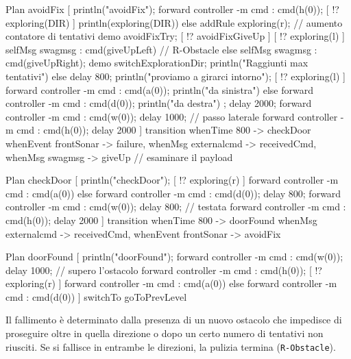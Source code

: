 \documentclass{../llncs}
\newcommand{\code}[1]{{\color{blue}\small{\texttt{#1}}}}
\begin{document}
\begin{qacode}[caption={SoftwareAgent, pt8}]
Plan avoidFix [
	println("avoidFix");
	forward controller -m cmd : cmd(h(0));
	[ !? exploring(DIR) ] println(exploring(DIR))
	else addRule exploring(r);
	// aumento contatore di tentativi
	demo avoidFixTry;
	[ !? avoidFixGiveUp ] {
		[ !? exploring(l) ] selfMsg swagmsg : cmd(giveUpLeft) // R-Obstacle
		else selfMsg swagmsg : cmd(giveUpRight);
		demo switchExplorationDir;
		println("Raggiunti max tentativi")
	} else {
		delay 800;
		println("proviamo a girarci intorno");
		[ !? exploring(l) ] {
			forward controller -m cmd : cmd(a(0));
			println("da sinistra")
		}
		else {
			forward controller -m cmd : cmd(d(0));
			println("da destra")
		};
		delay 2000;
		forward controller -m cmd : cmd(w(0));
		delay 1000; // passo laterale
		forward controller -m cmd : cmd(h(0));
		delay 2000
	}
]
transition
	whenTime 800 -> checkDoor
	whenEvent frontSonar -> failure,
	whenMsg externalcmd -> receivedCmd,
	whenMsg swagmsg -> giveUp // esaminare il payload

Plan checkDoor [
	println("checkDoor");
	[ !? exploring(r) ] forward controller -m cmd : cmd(a(0))
	else forward controller -m cmd : cmd(d(0));
	delay 800;
	forward controller -m cmd : cmd(w(0));
	delay 800; // testata
	forward controller -m cmd : cmd(h(0));
	delay 2000
]
transition
	whenTime 800 -> doorFound
	whenMsg externalcmd -> receivedCmd,
	whenEvent frontSonar -> avoidFix

Plan doorFound [
	println("doorFound");
	forward controller -m cmd : cmd(w(0));
	delay 1000; // supero l'ostacolo
	forward controller -m cmd : cmd(h(0));
	[ !? exploring(r) ] forward controller -m cmd : cmd(a(0))
	else forward controller -m cmd : cmd(d(0))
]
switchTo goToPrevLevel
\end{qacode}

Il fallimento è determinato dalla presenza di un nuovo ostacolo che impedisce di proseguire oltre in quella direzione o dopo un certo numero di tentativi non riusciti. Se si fallisce in entrambe le direzioni, la pulizia termina (\code{R-Obstacle}).\\
\end{document}
